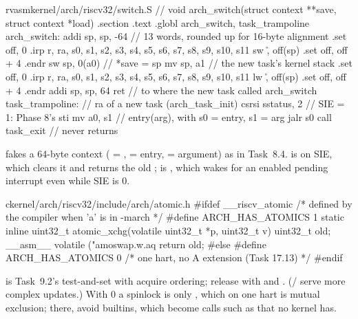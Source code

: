 \documentclass[11pt,a4paper]{article}
\begin{document}
\begin{lst}{rvasm}{kernel/arch/riscv32/switch.S}
// void arch_switch(struct context **save, struct context *load)
    .section .text
    .globl arch_switch, task_trampoline
arch_switch:
    addi  sp, sp, -64               // 13 words, rounded up for 16-byte alignment
    .set  off, 0
    .irp  r, ra, s0, s1, s2, s3, s4, s5, s6, s7, s8, s9, s10, s11
    sw    \r, off(sp)
    .set  off, off + 4
    .endr
    sw    sp, 0(a0)                 // *save = sp
    mv    sp, a1                    // the new task's kernel stack
    .set  off, 0
    .irp  r, ra, s0, s1, s2, s3, s4, s5, s6, s7, s8, s9, s10, s11
    lw    \r, off(sp)
    .set  off, off + 4
    .endr
    addi  sp, sp, 64
    ret                             // to where the new task called arch_switch
task_trampoline:                    // ra of a new task (arch_task_init)
    csrsi sstatus, 2                // SIE = 1: Phase 8's sti
    mv    a0, s1                    // entry(arg), with s0 = entry, s1 = arg
    jalr  s0
    call  task_exit                 // never returns
\end{lst}

 fakes a 64-byte context ( = ,  = entry,  =
argument) as in Task~8.4.  is  on SIE, which clears it and returns the old ;
 is , which wakes for an enabled pending interrupt even while SIE is 0.

\begin{lst}{c}{kernel/arch/riscv32/include/arch/atomic.h}
#ifdef __riscv_atomic                   /* defined by the compiler when 'a' is in -march */
#define ARCH_HAS_ATOMICS 1
static inline uint32_t atomic_xchg(volatile uint32_t *p, uint32_t v)
{
    uint32_t old;
    __asm__ volatile ("amoswap.w.aq %
    return old;
}
#else
#define ARCH_HAS_ATOMICS 0              /* one hart, no A extension (Task 17.13) */
#endif
\end{lst}

 is Task~9.2's test-and-set with acquire ordering; release with  and
. (/ serve more complex updates.) With  0 a spinlock
is only , which on one hart is mutual exclusion; there, avoid  builtins, which become calls
such as  that no kernel has.
\end{document}
